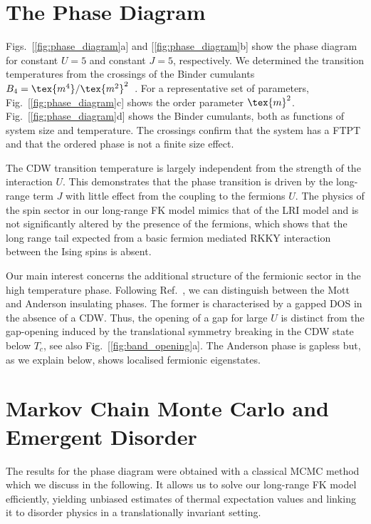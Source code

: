 \section{The Phase Diagram} 
Figs.~[\ref{fig:phase_diagram}a] and [\ref{fig:phase_diagram}b] show the phase diagram for constant \(U=5\) and constant \(J=5\), respectively. We determined the transition temperatures from the crossings of the Binder cumulants \(B_4 = \tex{m^4}/\tex{m^2}^2\)~\cite{binderFiniteSizeScaling1981}. For a representative set of parameters, Fig.~[\ref{fig:phase_diagram}c] shows the order parameter \(\tex{m}^2\). Fig.~[\ref{fig:phase_diagram}d] shows the Binder cumulants, both as functions of system size and temperature. The crossings confirm that the system has a \ac{FTPT} and that the ordered phase is not a finite size effect. 

The CDW transition temperature is largely independent from the strength of the interaction \(U\). This demonstrates that the phase transition is driven by the long-range term \(J\) with little effect from the coupling to the fermions \(U\).  The physics of the spin sector in our long-range \ac{FK} model mimics that of the \ac{LRI} model and is not significantly altered by the presence of the fermions, which shows that the long range tail expected from a basic fermion mediated RKKY interaction between the Ising spins is absent. 

Our main interest concerns the additional structure of the fermionic sector in the high temperature phase. Following Ref.~\cite{antipovInteractionTunedAndersonMott2016}, we can distinguish between the Mott and Anderson insulating phases. The former is characterised by a gapped \ac{DOS} in the absence of a \ac{CDW}. Thus, the opening of a gap for large \(U\) is distinct from the gap-opening induced by the translational symmetry breaking in the CDW state below \(T_c\), see also Fig.~[\ref{fig:band_opening}a]. The Anderson phase is gapless but, as we explain below, shows localised fermionic eigenstates. 

\section{Markov Chain Monte Carlo and Emergent Disorder}
The results for the phase diagram were obtained with a classical \ac{MCMC} method which we discuss in the following. It allows us to solve our long-range \ac{FK} model efficiently, yielding unbiased estimates of thermal expectation values and linking it to disorder physics in a translationally invariant setting.

